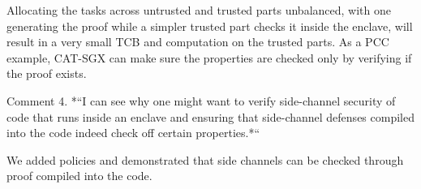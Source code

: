 {Allocating the tasks across untrusted and trusted parts unbalanced, with one generating the proof while a simpler trusted part checks it inside the enclave, will result in a very small TCB and computation on the trusted parts. As a PCC example, CAT-SGX can make sure the properties are checked only by verifying if the proof exists.


Comment 4. *“I can see why one might want to verify side-channel security of code that runs inside an enclave and ensuring that side-channel defenses compiled into the code indeed check off certain properties.*“

We added policies and demonstrated that side channels can be checked through proof compiled into the code. 

}